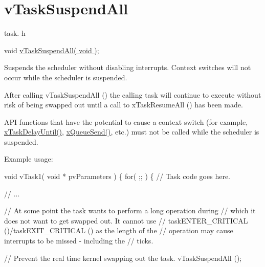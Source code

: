 \hypertarget{group__v_task_suspend_all}{}\section{v\+Task\+Suspend\+All}
\label{group__v_task_suspend_all}
task. h 
\begin{DoxyPre}
void \hyperlink{externals_2freertos_2include_2task_8h_a366b302eba79d10b5ee2a3756f0fcc43}{vTaskSuspendAll( void )};
\end{DoxyPre}


Suspends the scheduler without disabling interrupts. Context switches will not occur while the scheduler is suspended.

After calling v\+Task\+Suspend\+All () the calling task will continue to execute without risk of being swapped out until a call to x\+Task\+Resume\+All () has been made.

A\+PI functions that have the potential to cause a context switch (for example, \hyperlink{externals_2freertos_2include_2task_8h_af7ba46e730bec507c8a20d9f9b9c0e1d}{x\+Task\+Delay\+Until()}, \hyperlink{externals_2freertos_2include_2queue_8h_af7eb49d3249351176992950d9185abe9}{x\+Queue\+Send()}, etc.) must not be called while the scheduler is suspended.

Example usage\+: 
\begin{DoxyPre}
void vTask1( void * pvParameters )
\{
  for( ;; )
  \{
      // Task code goes here.\end{DoxyPre}



\begin{DoxyPre}      // ...\end{DoxyPre}



\begin{DoxyPre}      // At some point the task wants to perform a long operation during
      // which it does not want to get swapped out.  It cannot use
      // taskENTER\_CRITICAL ()/taskEXIT\_CRITICAL () as the length of the
      // operation may cause interrupts to be missed - including the
      // ticks.\end{DoxyPre}



\begin{DoxyPre}      // Prevent the real time kernel swapping out the task.
      vTaskSuspendAll ();\end{DoxyPre}



